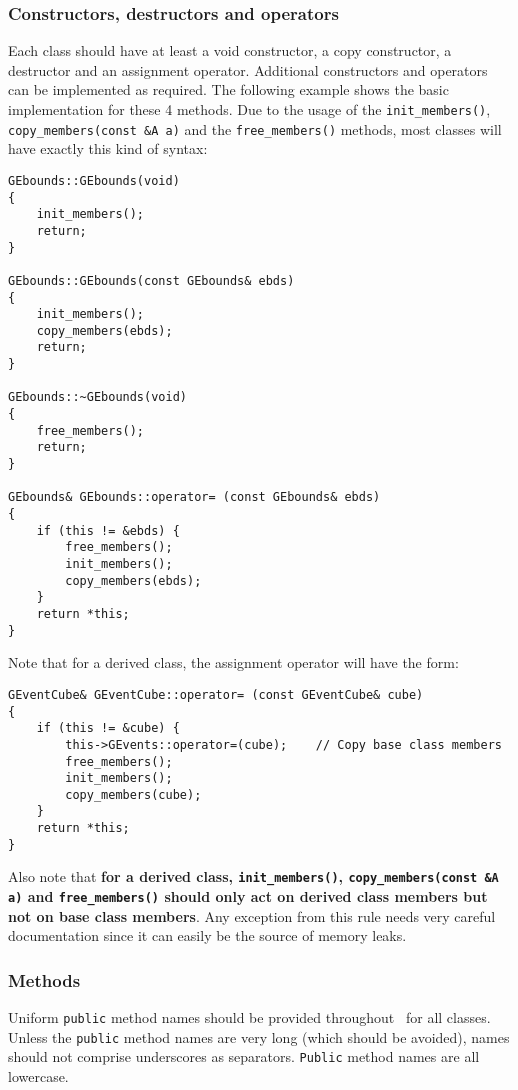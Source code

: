 \documentclass{article}[12pt,a4]
\begin{document}
\subsubsection{Constructors, destructors and operators}

Each class should have at least a void constructor, a copy constructor, a destructor and
an assignment operator.
Additional constructors and operators can be implemented as required.
The following example shows the basic implementation for these 4 methods.
Due to the usage of the {\tt init\_members()}, {\tt copy\_members(const \&A a)} and the
{\tt free\_members()} methods, most classes will have exactly this kind of syntax:
\begin{verbatim}
GEbounds::GEbounds(void)
{
    init_members();
    return;
}

GEbounds::GEbounds(const GEbounds& ebds)
{
    init_members();
    copy_members(ebds);
    return;
}

GEbounds::~GEbounds(void)
{
    free_members();
    return;
}

GEbounds& GEbounds::operator= (const GEbounds& ebds)
{
    if (this != &ebds) {
        free_members();
        init_members();
        copy_members(ebds);
    }
    return *this;
}
\end{verbatim}
Note that for a derived class, the assignment operator will have the form:
\begin{verbatim}
GEventCube& GEventCube::operator= (const GEventCube& cube)
{
    if (this != &cube) {
        this->GEvents::operator=(cube);    // Copy base class members
        free_members();
        init_members();
        copy_members(cube);
    }
    return *this;
}
\end{verbatim}
Also note that {\bf for a derived class, {\tt init\_members()}, {\tt copy\_members(const \&A a)}
and {\tt free\_members()} should only act on derived class members but not on
base class members}.
Any exception from this rule needs very careful documentation since it can easily be
the source of memory leaks.


\subsubsection{Methods}

Uniform {\tt public} method names should be provided throughout \this\ for all classes.
Unless the {\tt public} method names are very long (which should be avoided), names
should not comprise underscores as separators.
{\tt Public} method names are all lowercase.
\end{document}
